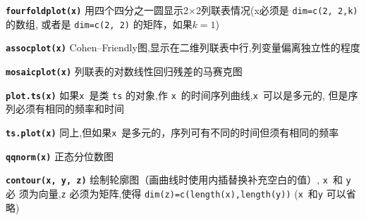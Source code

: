 \documentclass[landscape]{article}
\newcommand{\code}{\texttt}
\newcommand{\bcode}[1]{\texttt{\textbf{#1}}}
\begin{document}
\begin{multicols*}{3}
\bcode{fourfoldplot(x)}  用四个四分之一圆显示2$\times$2列联表情况(x必须是 \code{dim=c(2, 2,k)}的数组,
或者是 \code{dim=c(2, 2)} 的矩阵，如果$k=1$)

\bcode{assocplot(x)}  Cohen--Friendly图,显示在二维列联表中行,列变量偏离独立性的程度

\bcode{mosaicplot(x)}  列联表的对数线性回归残差的马赛克图


\bcode{plot.ts(x)}  如果\code{x}~是类 \code{ts} 的对象,作 \code{x}~的时间序列曲线,\code{x}~可以是多元的,
但是序列必须有相同的频率和时间

\bcode{ts.plot(x)}  同上,但如果\code{x}~是多元的，序列可有不同的时间但须有相同的频率

\bcode{qqnorm(x)}  正态分位数图


\bcode{contour(x, y, z)}  绘制轮廓图（画曲线时使用内插替换补充空白的值）, \code{x}~和 \code{y} 必
须为向量,\code{z} 必须为矩阵,使得 \code{dim(z)=c(length(x),length(y))} (\code{x}~和\code{y} 可以省略)


\end{multicols*}
\end{document}
